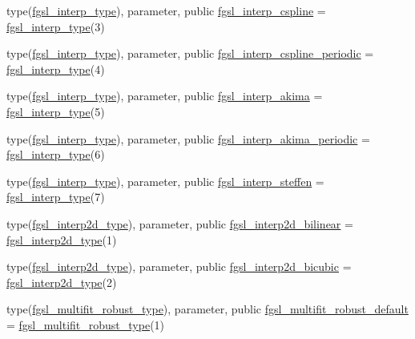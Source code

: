 \begin{DoxyCompactItemize}
\item 
type(\hyperlink{structfgsl_1_1fgsl__interp__type}{fgsl\+\_\+interp\+\_\+type}), parameter, public \hyperlink{namespacefgsl_aa03de96a2a37daa1c2e464b98e198eb3}{fgsl\+\_\+interp\+\_\+cspline} = \hyperlink{structfgsl_1_1fgsl__interp__type}{fgsl\+\_\+interp\+\_\+type}(3)
\item 
type(\hyperlink{structfgsl_1_1fgsl__interp__type}{fgsl\+\_\+interp\+\_\+type}), parameter, public \hyperlink{namespacefgsl_a383cf4d39acd2faf1d29a204d9349043}{fgsl\+\_\+interp\+\_\+cspline\+\_\+periodic} = \hyperlink{structfgsl_1_1fgsl__interp__type}{fgsl\+\_\+interp\+\_\+type}(4)
\item 
type(\hyperlink{structfgsl_1_1fgsl__interp__type}{fgsl\+\_\+interp\+\_\+type}), parameter, public \hyperlink{namespacefgsl_a7da81682e22860ff3f743dcf2e80b6e5}{fgsl\+\_\+interp\+\_\+akima} = \hyperlink{structfgsl_1_1fgsl__interp__type}{fgsl\+\_\+interp\+\_\+type}(5)
\item 
type(\hyperlink{structfgsl_1_1fgsl__interp__type}{fgsl\+\_\+interp\+\_\+type}), parameter, public \hyperlink{namespacefgsl_ae51f422b992227f64fb8505b62335502}{fgsl\+\_\+interp\+\_\+akima\+\_\+periodic} = \hyperlink{structfgsl_1_1fgsl__interp__type}{fgsl\+\_\+interp\+\_\+type}(6)
\item 
type(\hyperlink{structfgsl_1_1fgsl__interp__type}{fgsl\+\_\+interp\+\_\+type}), parameter, public \hyperlink{namespacefgsl_ae9546a0778cace93ab276425caea840b}{fgsl\+\_\+interp\+\_\+steffen} = \hyperlink{structfgsl_1_1fgsl__interp__type}{fgsl\+\_\+interp\+\_\+type}(7)
\item 
type(\hyperlink{structfgsl_1_1fgsl__interp2d__type}{fgsl\+\_\+interp2d\+\_\+type}), parameter, public \hyperlink{namespacefgsl_aaa41b206c74a9dd325809f55b148d24e}{fgsl\+\_\+interp2d\+\_\+bilinear} = \hyperlink{structfgsl_1_1fgsl__interp2d__type}{fgsl\+\_\+interp2d\+\_\+type}(1)
\item 
type(\hyperlink{structfgsl_1_1fgsl__interp2d__type}{fgsl\+\_\+interp2d\+\_\+type}), parameter, public \hyperlink{namespacefgsl_ad4d0be659abe19e96011c7a31d8c7e1c}{fgsl\+\_\+interp2d\+\_\+bicubic} = \hyperlink{structfgsl_1_1fgsl__interp2d__type}{fgsl\+\_\+interp2d\+\_\+type}(2)
\item 
type(\hyperlink{structfgsl_1_1fgsl__multifit__robust__type}{fgsl\+\_\+multifit\+\_\+robust\+\_\+type}), parameter, public \hyperlink{namespacefgsl_ac1a0aa1e007066fb5ae50fcae0e1c885}{fgsl\+\_\+multifit\+\_\+robust\+\_\+default} = \hyperlink{structfgsl_1_1fgsl__multifit__robust__type}{fgsl\+\_\+multifit\+\_\+robust\+\_\+type}(1)

\end{DoxyCompactItemize}
